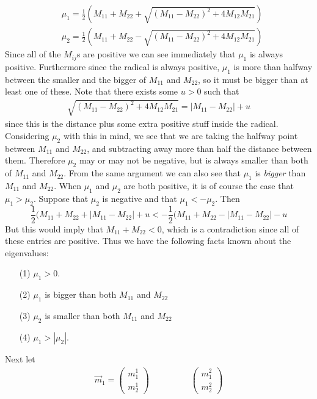 \documentclass{article}
\theoremstyle{theorem}
\begin{document}
\begin{align}
	& \mu_1 =  \frac{1}{2}(M_{11}+M_{22}+\sqrt{(M_{11}-M_{22})^2 + 4M_{12}M_{21}}) \\
 & \mu_2 =  \frac{1}{2}(M_{11}+M_{22}-\sqrt{(M_{11}-M_{22})^2 + 4M_{12}M_{21}}) 
\end{align} 
Since all of the $M_{ij}$s are positive we can see immediately that $\mu_1$ is always positive. Furthermore since the radical is always positive, $\mu_1$ is more than halfway between the smaller and the bigger of $M_{11}$ and $M_{22}$, so it must be bigger than at least one of these. Note that there exists some $u>0$ such that 
\begin{align}
	\sqrt{(M_{11}-M_{22})^2 + 4M_{12}M_{21}} = |M_{11} - M_{22}| + u 
\end{align} 
since this is the distance plus some extra positive stuff inside the radical. Considering $\mu_2$ with this in mind, we see that we are taking the halfway point between $M_{11}$ and $M_{22}$, and subtracting away more than half the distance between them. Therefore $\mu_2$ may or may not be negative, but is always smaller than  both of $M_{11}$ and $M_{22}$. From the same argument we can also see that $\mu_1$ is \emph{bigger} than $M_{11}$ and $M_{22}$. When $\mu_1$ and $\mu_2$ are both positive, it is of course the case that $\mu_1 > \mu_2$. Suppose that $\mu_2$ is negative and that $\mu_1 < -\mu_2$. Then 
\[ \frac{1}{2}(M_{11}+M_{22}+|M_{11} - M_{22}| + u < -\frac{1}{2}(M_{11}+M_{22}-|M_{11} - M_{22}| - u \]
But this would imply that $M_{11} + M_{22} < 0$, which is a contradiction since all of these entries are positive. Thus we have the following facts known about the eigenvalues:
\begin{itemize}
	\item[(1)] $\mu_1 > 0$.
	\item[(2)] $\mu_1$ is bigger than both $M_{11}$ and $M_{22}$
	\item[(3)] $\mu_2$ is smaller than both $M_{11}$ and $M_{22}$
	\item[(4)] $\mu_1 > |\mu_2|$.
\end{itemize}
Next let
\begin{align}
	\vec{m}_1 = \begin{pmatrix} m^1_1 \\ m^1_2 \end{pmatrix}  \hspace{2cm} \begin{pmatrix} m^2_1 \\ m^2_2 \end{pmatrix}
\end{align}
\end{document}
